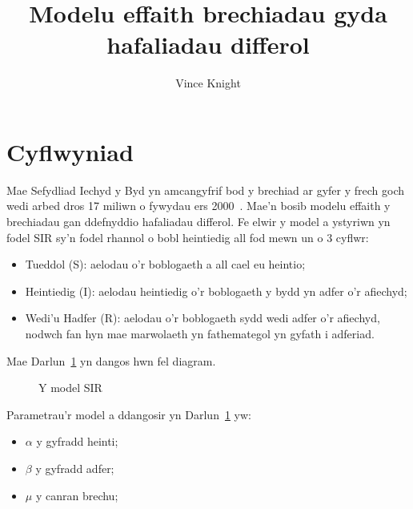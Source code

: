 \documentclass[a4paper]{article}
\title{Modelu effaith brechiadau gyda hafaliadau differol}
\author{Vince Knight}
\date{}
\begin{document}
\maketitle


\section{Cyflwyniad}\label{sec:introduction}

Mae Sefydliad Iechyd y Byd yn amcangyfrif bod y brechiad ar gyfer y frech goch
wedi arbed dros 17 miliwn o fywydau ers 2000~\cite{who}. Mae'n bosib modelu
effaith y brechiadau gan ddefnyddio hafaliadau differol. Fe elwir y model a
ystyriwn yn fodel SIR sy'n fodel rhannol o bobl heintiedig  all fod mewn un o 3
cyflwr:

\begin{itemize}
    \item Tueddol (S): aelodau o'r boblogaeth a all cael eu heintio;
    \item Heintiedig (I): aelodau heintiedig o'r boblogaeth y bydd yn adfer o'r
    afiechyd;
    \item Wedi'u Hadfer (R): aelodau o'r boblogaeth sydd wedi adfer o'r afiechyd,
    nodwch fan hyn mae marwolaeth yn fathemategol yn gyfath i adferiad.
\end{itemize}

Mae Darlun~\ref{fig:sir_model} yn dangos hwn fel diagram.

\begin{figure}[!hbtp]
    \begin{center}
    \end{center}
    \caption{Y model SIR}
    \label{fig:sir_model}
\end{figure}

Parametrau'r model a ddangosir yn Darlun~\ref{fig:sir_model} yw:

\begin{itemize}
    \item \(\alpha\) y gyfradd heinti;
    \item \(\beta\) y gyfradd adfer;
    \item \(\mu\) y canran brechu;
\end{itemize}
\end{document}
